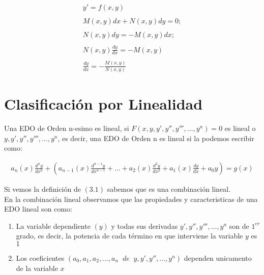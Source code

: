 \begin{equation*}
    \begin{gathered}
        y'=f(x,y) \\\\
        M(x,y)dx+N(x,y)dy=0;\\\\
        N(x,y)dy=-M(x,y)dx;\\\\
        N(x,y)\frac{dy}{dx}=-M(x,y)\\\\
        \frac{dy}{dx}=-\frac{M(x,y)}{N(x,y)}
    \end{gathered}
\end{equation*}

\clearpage
\section{Clasificación por Linealidad}

Una EDO de Orden n-esimo es lineal, si \(\displaystyle F(x,y,y',y'',y''',\ldots,y^{n})=0\) es lineal o \(\displaystyle y,y',y'',y''' ,\ldots,y^{n}\), es decir, una EDO de Orden n es lineal si la podemos escribir como:

\begin{equation}
    \begin{gathered}
        a_{n}(x)\frac{d^{n}y}{dx^{n}}+\left( a_{n-1}(x)\frac{d^{n-1}y}{dx^{n-1}}+\ldots+a_{2}(x)\frac{d^{2}y}{dx^{2}}+a_{1}(x)\frac{dy}{dx}+a_{0}y\right)=g(x)
    \end{gathered}
\end{equation}

Si vemos la definición de \(\displaystyle (3.1)\) sabemos que es una combinación lineal.\\

En la combinación lineal observamos que las propiedades y caracteristicas de una EDO lineal son como:

\begin{enumerate}
  \item La variable dependiente \(\displaystyle (y)\) y todas sus derivadas \(\displaystyle y',y'',y''',\ldots,y^{n}\) son de \(\displaystyle 1^{er}\) grado, es decir, la potencia de cada término en que interviene la variable \(\displaystyle y\) es \(\displaystyle 1\)
  \item Los coeficientes \(\displaystyle\left(a_{0},a_{1},a_{2},\ldots,a_{n}\;\;de\;\;y,y',y'',\ldots,y^{n}\right)\) dependen unicamento de la variable \(\displaystyle x\)
\end{enumerate}

